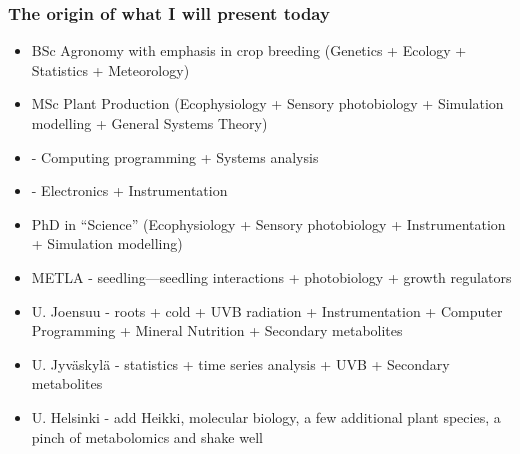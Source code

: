 \documentclass[10pt]{beamer}\usepackage[]{graphicx}\usepackage[]{xcolor}
\begin{document}
\begin{frame}
  \frametitle{The origin of what I will present today}
  \begin{itemize}
    \item BSc Agronomy with emphasis in crop breeding (Genetics + Ecology + Statistics + Meteorology)
    \item MSc Plant Production (Ecophysiology + Sensory photobiology + Simulation modelling + General Systems Theory)
    \item - Computing programming + Systems analysis
    \item - Electronics + Instrumentation
    \item PhD in ``Science'' (Ecophysiology + Sensory photobiology + Instrumentation + Simulation modelling)
    \item METLA - seedling---seedling interactions + photobiology + growth regulators
    \item U. Joensuu - roots + cold + UVB radiation + Instrumentation + Computer Programming + Mineral Nutrition + Secondary metabolites
    \item U. Jyväskylä - statistics + time series analysis + UVB + Secondary metabolites
    \item U. Helsinki - add Heikki, molecular biology, a few additional plant species, a pinch of metabolomics and shake well
  \end{itemize}
\end{frame}
\end{document}
